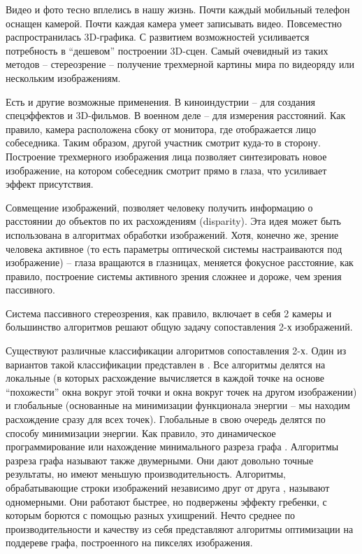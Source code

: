
Видео и фото тесно вплелись в нашу жизнь. Почти каждый
мобильный телефон оснащен камерой. Почти каждая камера умеет записывать видео. Повсеместно распространилась 3D-графика.
С развитием возможностей усиливается потребность в “дешевом”
построении 3D-сцен. Самый очевидный из таких методов -- стереозрение -- получение трехмерной картины мира по видеоряду
или нескольким изображениям.

Есть и другие возможные применения. В киноиндустрии -- для
создания спецэффектов и 3D-фильмов. В военном деле -- для измерения расстояний. Как правило, камера
расположена сбоку от монитора, где отображается лицо собеседника. Таким образом, другой участник смотрит куда-то в сторону.
Построение трехмерного изображения лица позволяет синтезировать новое изображение, на котором собеседник смотрит прямо в
глаза, что усиливает эффект присутствия.

Совмещение изображений, позволяет человеку получить информацию о расстоянии до объектов по их расхождениям (disparity).
Эта идея может быть использована в алгоритмах обработки изображений. Хотя, конечно же, зрение человека активное (то есть параметры оптической системы настраиваются под изображение) -- глаза вращаются в глазницах, меняется фокусное расстояние, как
правило, построение системы активного зрения сложнее и дороже,
чем зрения пассивного.

Система пассивного стереозрения, как правило, включает в себя 2 камеры и большинство алгоритмов решают общую задачу сопоставления 2-х изображений.

Существуют различные классификации алгоритмов сопоставления 2-х. Один из вариантов такой классификации представлен
в \cite{3}. Все алгоритмы делятся на локальные (в которых расхождение вычисляется в каждой точке на основе “похожести” окна вокруг этой точки и окна вокруг точек на другом изображении) и
глобальные (основанные на минимизации функционала энергии --
мы находим расхождение сразу для всех точек). Глобальные в свою
очередь делятся по способу минимизации энергии. Как правило, это
динамическое программирование \cite{4,5,6,7} или нахождение минимального разреза графа \cite{8,9}. Алгоритмы разреза графа называют также двумерными. Они дают довольно точные результаты, но имеют
меньшую производительность. Алгоритмы, обрабатывающие строки изображений независимо друг от друга \cite{4,5}, называют одномерными. Они работают быстрее, но подвержены эффекту гребенки, с
которым борются с помощью разных ухищрений. Нечто среднее по
производительности и качеству из себя представляют алгоритмы
оптимизации на поддереве графа, построенного на пикселях изображения.

